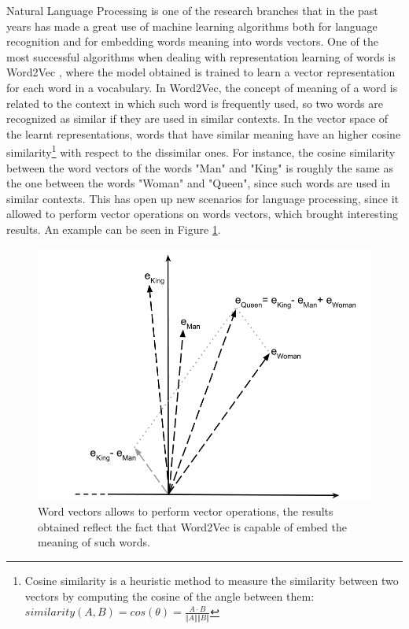 \documentclass[%
    corpo=13.5pt,
    twoside,
    oldstyle,
    tipotesi=magistrale,
    greek,
    evenboxes
]{toptesi}
\begin{document}
Natural Language Processing is one of the research branches that in
the past years has made a great use of machine learning algorithms both for
language recognition and for embedding words meaning into words
vectors.
One of the most successful algorithms when dealing with representation learning
of words is Word2Vec \cite{mikolov2013}, where the model obtained is trained to
learn a vector representation for each word in a vocabulary.
In Word2Vec, the concept of meaning of a word is related to the context in
which such word is frequently used, so two words are recognized as similar if
they are used in similar contexts. In the vector space of the learnt
representations, words that have similar meaning have an higher
cosine similarity\footnote{
    Cosine similarity is a heuristic method to measure the
    similarity between two vectors by computing the cosine of the angle between
    them:
    $similarity(A,B) = cos(\theta) = \frac{A \cdot B}{\Vert A \Vert \Vert B \Vert}$
}
with respect to the dissimilar ones.
For instance, the cosine similarity between the word vectors of the words "Man"
and "King" is roughly the same as the one between the words "Woman" and "Queen",
since such words are used in similar contexts. This has open up new scenarios
for language processing, since it allowed to perform vector
operations on words vectors, which brought interesting results.
An example can be seen in Figure \ref{fig:word2vec}.

\begin{figure}[t]
    \centering
    \includegraphics[scale=0.4]{img/word2vec.png}
    \caption{
        Word vectors allows to perform vector operations, the results
        obtained reflect the fact that Word2Vec is capable of embed the
        meaning of such words.
    }
    \label{fig:word2vec}
    \end{figure}
\end{document}
